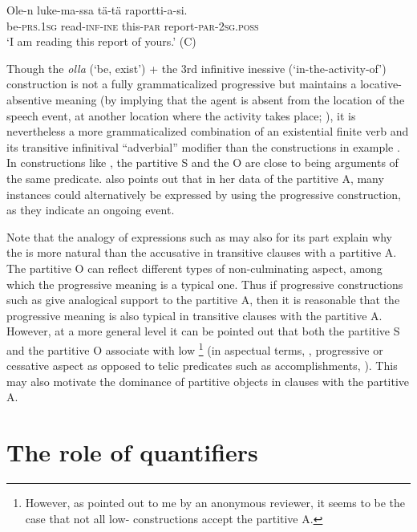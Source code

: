 \documentclass[output=paper]{LSP/langsci}
\begin{document}
\ea\label{15-hu-ex:31}
\gll Ole-n luke-ma-ssa tä-tä raportti-a-si.\\
be-\textsc{prs}.\textsc{1sg} read-\textsc{inf}-\textsc{ine} this-\textsc{par} report-\textsc{par}-\textsc{2sg}.\textsc{poss}\\
\glt `I am reading this report of yours.’  (C)
\z

Though the  \textit{olla} (‘be, exist’) + the 3rd infinitive inessive (‘in-the-activity-of’) construction is not a fully grammaticalized progressive but maintains a locative-absen\-tive meaning (by implying that the agent is absent from the location of the speech event, at another location where the activity takes place; \cf \citealt{Markkanen1979Tense,Tommola2000Progressive,Onikki-Rantajsk2005Elv}), it is nevertheless a more grammaticalized combination of an existential finite verb and its transitive infinitival “adverbial” modifier than the constructions in example . In constructions like , the partitive S and the O are close to being arguments of the same predicate. \citet[165]{Yli-Vakkuri1979Partitiivisubjektin} also points out that in her data of the partitive A, many instances could alternatively be expressed by using the progressive construction, as they indicate an ongoing event. 

Note that the analogy of expressions such as  may also for its part  explain why the  is more natural than the accusative in transitive clauses with a partitive A. The partitive O can reflect different types of non-culminating aspect, among which the progressive meaning is a typical one. Thus if progressive constructions such as  give analogical support to the partitive A, then it is reasonable that the progressive meaning is also typical in transitive clauses with the partitive A. However, at a more general level it can be pointed out that both the partitive S and the partitive O associate with low \footnote{However, as pointed out to me by an anonymous reviewer, it seems to be the case that not all low- constructions accept the partitive A.} (in aspectual terms, , progressive or cessative aspect as opposed to telic predicates such as accomplishments, \cf \citealt{Huumo2010Nominal}). This may also motivate the dominance of partitive objects in clauses with the partitive A. 

\section{The role of quantifiers}\label{15-hu-sec:6}
\end{document}
